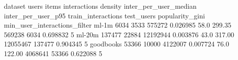   dataset  users  items  interactions  density  inter_per_user_median  inter_per_user_p95  train_interactions  test_users  popularity_gini  min_user_interactions_filter
    ml-1m   6034   3533        575272 0.026985                   58.0              299.35              569238        6034         0.698832                             5
   ml-20m 137477  22884      12192944 0.003876                   43.0              317.00            12055467      137477         0.904345                             5
goodbooks  53366  10000       4122007 0.007724                   76.0              122.00             4068641       53366         0.622088                             5